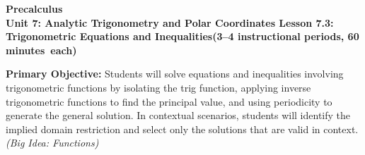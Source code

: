 \documentclass[10pt]{article}
\newcommand{\CourseName}{Precalculus}
\newcommand{\MeetingLength}{60 minutes}
\newcommand{\UnitNumberName}{Unit 7: Analytic Trigonometry and Polar Coordinates \quad}
\newcommand{\LessonNumberName}{Lesson 7.3: Trigonometric Equations and Inequalities}
\begin{document}
\begin{center}
  {\Large\bfseries \CourseName} \\[4pt]
  {\small\bfseries \UnitNumberName \LessonNumberName \quad (3--4 instructional periods, \MeetingLength\ each)}
\end{center}

\begin{tcolorbox}[colback=sky, colframe=navy, boxrule=0.9pt, arc=2mm,
    left=2mm, right=2mm, top=1.5mm, bottom=1.5mm]
  \textbf{Primary Objective:} Students will solve equations and inequalities
  involving trigonometric functions by isolating the trig function, applying
  inverse trigonometric functions to find the principal value, and using
  periodicity to generate the general solution. In contextual scenarios,
  students will identify the implied domain restriction and select only
  the solutions that are valid in context.
  \textit{(Big Idea: Functions)}
\end{tcolorbox}

\vspace{0.08in}
\end{document}

